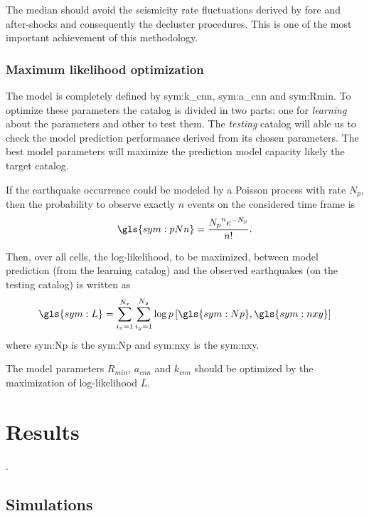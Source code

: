 \documentclass[draft, grl]{agutex}
\begin{document}
\begin{article}
The median should avoid the seismicity rate fluctuations derived by fore and after-shocks and consequently the decluster procedures. This is one of the most important achievement of this methodology.


\subsubsection{Maximum likelihood optimization}

The model is completely defined by \gls{sym:k_cnn}, \gls{sym:a_cnn} and \gls{sym:Rmin}. To optimize these parameters the catalog is divided in two parts: one for \emph{learning} about the parameters and other to test them. The \emph{testing} catalog will able us to check the model prediction performance derived from its chosen parameters. The best model parameters will maximize the prediction model capacity likely the target catalog.

If the earthquake occurrence could be modeled by a Poisson process with rate $N_p$, then the probability to observe exactly $n$ events on the considered time frame is
\begin{equation}
	\ensuremath{
		\gls{sym:pNn} = \frac{{N_p}^n e^{-N_p}}{n!}.
	}
	\label{eq:poisson_probability}
\end{equation}

Then, over all cells, the log-likelihood, to be maximized, between model prediction (from the learning catalog) and the observed earthquakes (on the testing catalog) is written as
\begin{equation}
	\ensuremath{
		\gls{sym:L} = \sum_{i_x=1}^{N_x}\sum_{i_y=1}^{N_y}\log p\left[  \gls{sym:Np}, \gls{sym:nxy}  \right]
	}
	\label{eq:loglik}
\end{equation}
where \gls{sym:Np} is the \glsdesc{sym:Np} and
	  \gls{sym:nxy} is the \glsdesc{sym:nxy}.

The model parameters $R_{min}$, $a_{cnn}$ and $k_{cnn}$ should be optimized by the maximization of log-likelihood $L$.



\section{Results}

.

\subsection{Simulations}


\end{article}
\end{document}
